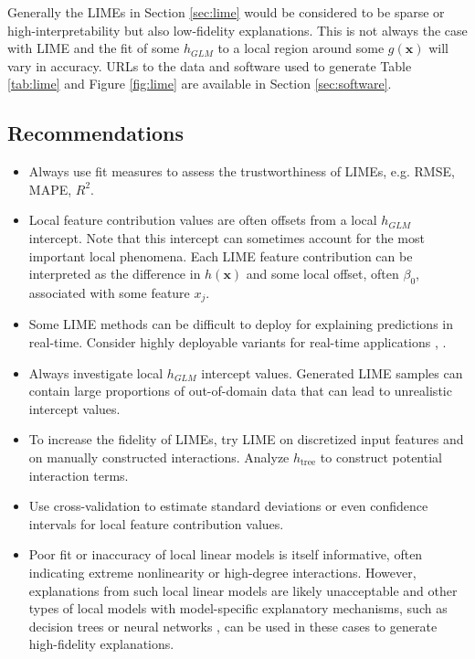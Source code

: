 \documentclass[sigconf, review]{acmart}
\begin{document}
Generally the LIMEs in Section \ref{sec:lime} would be considered to be sparse or high-interpretability but also low-fidelity explanations. This is not always the case with LIME and the fit of some $h_{GLM}$ to a local region around some $g(\mathbf{x})$ will vary in accuracy. URLs to the data and software used to generate Table \ref{tab:lime} and Figure \ref{fig:lime} are available in Section \ref{sec:software}.

\subsection{Recommendations}

\begin{itemize}
	
	\item Always use fit measures to assess the trustworthiness of LIMEs, e.g. RMSE, MAPE, $R^2$.

	\item Local feature contribution values are often offsets from a local $h_{GLM}$ intercept. Note that this intercept can sometimes account for the most important local phenomena. Each LIME feature contribution can be interpreted as the difference in $h(\mathbf{x})$ and some local offset, often $\beta_0$, associated with some feature $x_j$.

	\item Some LIME methods can be difficult to deploy for explaining predictions in real-time. Consider highly deployable variants for real-time applications \cite{h2o_mli_booklet}, \cite{lime-sup}.
		
	\item Always investigate local $h_{GLM}$ intercept values. Generated LIME samples can contain large proportions of out-of-domain data that can lead to unrealistic intercept values. 
		
	\item To increase the fidelity of LIMEs, try LIME on discretized input features and on manually constructed interactions. Analyze $h_{\text{tree}}$ to construct potential interaction terms.
 	
	\item Use cross-validation to estimate standard deviations or even confidence intervals for local feature contribution values.
	
	\item Poor fit or inaccuracy of local linear models is itself informative, often indicating extreme nonlinearity or high-degree interactions. However, explanations from such local linear models are likely unacceptable and other types of local models with model-specific explanatory mechanisms, such as decision trees or neural networks \cite{wf_xnn}, can be used in these cases to generate high-fidelity explanations.
	
\end{itemize}
\end{document}
